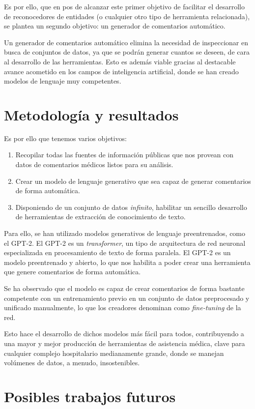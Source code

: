 Es por ello, que en pos de alcanzar este primer objetivo de facilitar el desarrollo de reconocedores de entidades (o cualquier otro tipo de herramienta relacionada), se plantea un segundo objetivo: un generador de comentarios automático.

Un generador de comentarios automático elimina la necesidad de inspeccionar en busca de conjuntos de datos, ya que se podrán generar cuantos se deseen, de cara al desarrollo de las herramientas. Esto es además viable gracias al destacable avance acometido en los campos de inteligencia artificial, donde se han creado modelos de lenguaje muy competentes.


\section{Metodología y resultados}
Es por ello que tenemos varios objetivos: 
\begin{enumerate}
	\item Recopilar todas las fuentes de información públicas que nos provean con datos de comentarios médicos listos para su análisis.
	\item Crear un modelo de lenguaje generativo que sea capaz de generar comentarios de forma automática.
	\item Disponiendo de un conjunto de datos \textit{infinito}, habilitar un sencillo desarrollo de herramientas de extracción de conocimiento de texto.
\end{enumerate}

Para ello, se han utilizado modelos generativos de lenguaje preentrenados, como el GPT-2. El GPT-2 es un \textit{transformer}, un tipo de arquitectura de red neuronal especializada en procesamiento de texto de forma paralela. El GPT-2 es un modelo preentrenado y abierto, lo que nos habilita a poder crear una herramienta que genere comentarios de forma automática.

Se ha observado que el modelo es capaz de crear comentarios de forma bastante competente con un entrenamiento previo en un conjunto de datos preprocesado y unificado manualmente, lo que los creadores denominan como \textit{fine-tuning} de la red. 

Esto hace el desarrollo de dichos modelos más fácil para todos, contribuyendo a una mayor y mejor producción de herramientas de asistencia médica, clave para cualquier complejo hospitalario medianamente grande, donde se manejan volúmenes de datos, a menudo, insostenibles.

\section{Posibles trabajos futuros}

